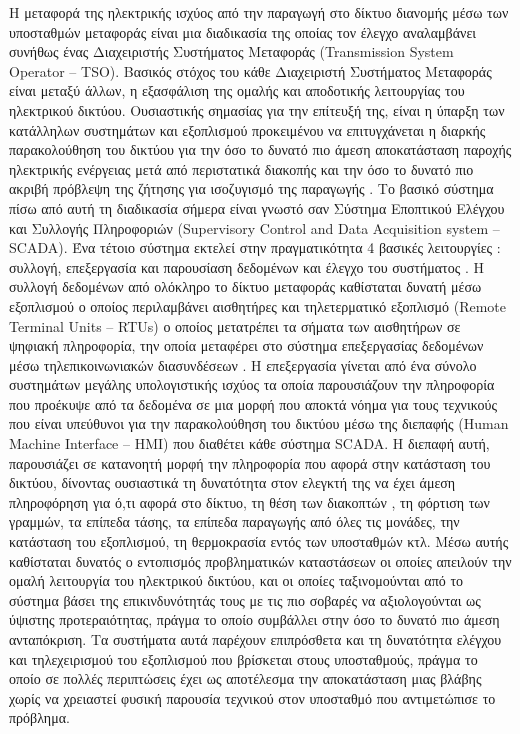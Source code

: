 \documentclass[12pt, a4paper, oneside]{report}
\begin{document}
Η μεταφορά της ηλεκτρικής ισχύος από την παραγωγή στο δίκτυο διανομής μέσω των υποσταθμών μεταφοράς είναι μια διαδικασία της οποίας τον έλεγχο αναλαμβάνει συνήθως ένας Διαχειριστής Συστήματος Μεταφοράς (Transmission System Operator – TSO). Βασικός στόχος του κάθε Διαχειριστή Συστήματος Μεταφοράς είναι μεταξύ άλλων, η εξασφάλιση της ομαλής και αποδοτικής λειτουργίας του ηλεκτρικού δικτύου. Ουσιαστικής σημασίας για την επίτευξή της, είναι η ύπαρξη των κατάλληλων συστημάτων και εξοπλισμού προκειμένου να επιτυγχάνεται η διαρκής παρακολούθηση του δικτύου για την όσο το δυνατό πιο άμεση αποκατάσταση παροχής ηλεκτρικής ενέργειας μετά από περιστατικά διακοπής και την όσο το δυνατό πιο ακριβή πρόβλεψη της ζήτησης για ισοζυγισμό της παραγωγής \cite{6}. Το βασικό σύστημα πίσω από αυτή τη διαδικασία σήμερα είναι γνωστό σαν Σύστημα Εποπτικού Ελέγχου και Συλλογής Πληροφοριών (Supervisory Control and Data Acquisition system – SCADA). Ένα τέτοιο σύστημα εκτελεί στην πραγματικότητα 4 βασικές λειτουργίες : συλλογή, επεξεργασία και παρουσίαση δεδομένων και έλεγχο του συστήματος \cite{9}. Η συλλογή δεδομένων από ολόκληρο το δίκτυο μεταφοράς καθίσταται δυνατή μέσω εξοπλισμού ο οποίος περιλαμβάνει αισθητήρες και τηλετερματικό εξοπλισμό (Remote Terminal Units – RTUs) ο οποίος μετατρέπει τα σήματα των αισθητήρων σε ψηφιακή πληροφορία, την οποία μεταφέρει στο σύστημα επεξεργασίας δεδομένων μέσω τηλεπικοινωνιακών διασυνδέσεων \cite{6,9}. Η επεξεργασία γίνεται από ένα σύνολο συστημάτων μεγάλης υπολογιστικής ισχύος τα οποία παρουσιάζουν την πληροφορία που προέκυψε από τα δεδομένα σε μια μορφή που αποκτά νόημα για τους τεχνικούς που είναι υπεύθυνοι για την παρακολούθηση του δικτύου μέσω της διεπαφής (Human Machine Interface – HMI) που διαθέτει κάθε σύστημα SCADA. Η διεπαφή αυτή, παρουσιάζει σε κατανοητή μορφή την πληροφορία που αφορά στην κατάσταση του δικτύου, δίνοντας ουσιαστικά τη δυνατότητα στον ελεγκτή της να έχει άμεση πληροφόρηση για ό,τι αφορά στο δίκτυο, τη θέση των διακοπτών , τη φόρτιση των γραμμών, τα επίπεδα τάσης, τα επίπεδα παραγωγής από όλες τις μονάδες, την κατάσταση του εξοπλισμού, τη θερμοκρασία εντός των υποσταθμών κτλ. Μέσω αυτής καθίσταται δυνατός ο εντοπισμός προβληματικών καταστάσεων οι οποίες απειλούν την ομαλή λειτουργία του ηλεκτρικού δικτύου, και οι οποίες ταξινομούνται από το σύστημα βάσει της επικινδυνότητάς τους με τις πιο σοβαρές να αξιολογούνται ως ύψιστης προτεραιότητας, πράγμα το οποίο συμβάλλει στην όσο το δυνατό πιο άμεση ανταπόκριση. Τα συστήματα αυτά παρέχουν επιπρόσθετα και τη δυνατότητα ελέγχου και τηλεχειρισμού του εξοπλισμού που βρίσκεται στους υποσταθμούς, πράγμα το οποίο σε πολλές περιπτώσεις έχει ως αποτέλεσμα την αποκατάσταση μιας βλάβης χωρίς να χρειαστεί φυσική παρουσία τεχνικού στον υποσταθμό που αντιμετώπισε το πρόβλημα.
\end{document}
